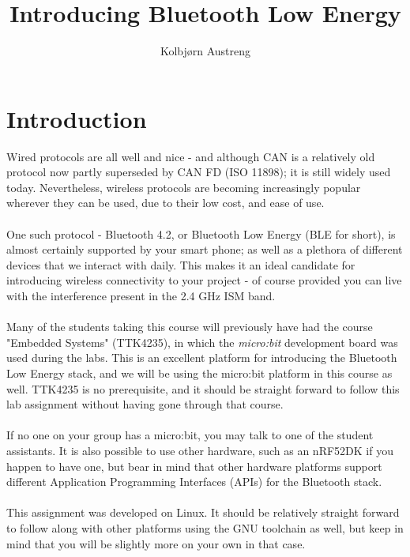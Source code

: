 \documentclass[11pt,a4paper]{article}
\title{Introducing Bluetooth Low Energy}
\author{Kolbjørn Austreng}
\date{}
\begin{document}
\maketitle

\renewcommand{\thesection}{\roman{section}}
\renewcommand{\thesubsection}{\roman{section}.\alph{subsection}}

\section{Introduction}
Wired protocols are all well and nice - and although CAN is a relatively old protocol now partly superseded by CAN FD (ISO 11898); it is still widely used today. Nevertheless, wireless protocols are becoming increasingly popular wherever they can be used, due to their low cost, and ease of use.\\
\\
One such protocol - Bluetooth 4.2, or Bluetooth Low Energy (BLE for short), is almost certainly supported by your smart phone; as well as a plethora of different devices that we interact with daily. This makes it an ideal candidate for introducing wireless connectivity to your project - of course provided you can live with the interference present in the 2.4 GHz ISM band.\\
\\
Many of the students taking this course will previously have had the course "Embedded Systems" (TTK4235), in which the \textit{micro:bit} development board was used during the labs. This is an excellent platform for introducing the Bluetooth Low Energy stack, and we will be using the micro:bit platform in this course as well. TTK4235 is no prerequisite, and it should be straight forward to follow this lab assignment without having gone through that course.\\
\\
If no one on your group has a micro:bit, you may talk to one of the student assistants. It is also possible to use other hardware, such as an nRF52DK if you happen to have one, but bear in mind that other hardware platforms support different Application Programming Interfaces (APIs) for the Bluetooth stack.\\
\\
This assignment was developed on Linux. It should be relatively straight forward to follow along with other platforms using the GNU toolchain as well, but keep in mind that you will be slightly more on your own in that case.

\newpage
\noindent
\end{document}
